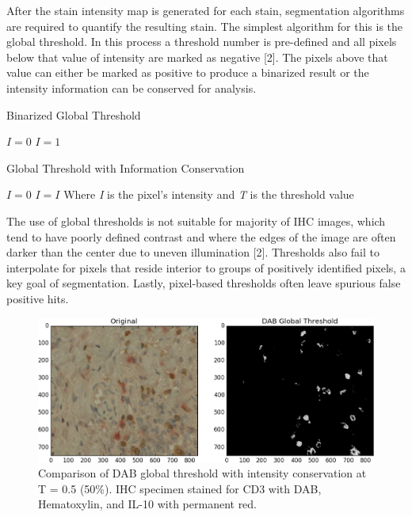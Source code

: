 \documentclass[12pt]{article}
\begin{document}
\newpage

After the stain intensity map is generated for each stain, segmentation algorithms are required to quantify the resulting stain. The simplest algorithm for this is the global threshold. In this process a threshold number is pre-defined and all pixels below that value of intensity are marked as negative [2]. The pixels above that value can either be marked as positive to produce a binarized result or the intensity information can be conserved for analysis.



\begin{algorithm}
\caption{Binarized Global Threshold}
\begin{algorithmic} 
\STATE $I = 0$
\STATE $I = 1$
\ENDIF
\ENDFOR
\end{algorithmic}
\end{algorithm}

\begin{algorithm}
\caption{Global Threshold with Information Conservation}
\begin{algorithmic} 
\STATE $I = 0$
\STATE $I = I$
\ENDIF
\ENDFOR
\STATE
\STATE Where \textit{I} is the pixel's intensity
\STATE and \textit{T} is the threshold value
\end{algorithmic}
\end{algorithm}


\noindent The use of global thresholds is not suitable for majority of IHC images, which tend to have poorly defined contrast and where the edges of the image are often darker than the center due to uneven illumination [2]. Thresholds also fail to interpolate for pixels that reside interior to groups of positively identified pixels, a key goal of segmentation. Lastly, pixel-based thresholds often leave spurious false positive hits.


\begin{figure}[H]
  \includegraphics[width=\linewidth]{2DABglobal.png}
  \caption{Comparison of DAB global threshold with intensity conservation at T = 0.5 (50\%). IHC specimen stained for CD3 with DAB, Hematoxylin, and IL-10 with permanent red.}
  \label{fig:DABglobal2}
\end{figure}
\end{document}
